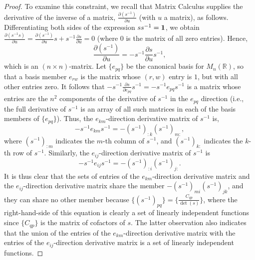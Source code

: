 \documentclass{amsart}
\numberwithin{equation}{section}
\theoremstyle{definition}
\numberwithin{theorem}{section}
\begin{document}
\begin{proof}
 To examine this constraint, we recall that Matrix Calculus supplies the derivative of the inverse of a matrix, $\frac{\partial (s^{-1})}{\partial u}$ (with $u$ a matrix), as follows.  Differentiating both sides of the expression
$ ss^{-1} = {\bf 1}$, we obtain $\frac{\partial (s^{-1}s)}{\partial u} = \frac{\partial (s^{-1})}{\partial u}s + s^{-1}\frac{\partial s}{\partial u}=0$ (where $0$ is the matrix of all zero entries).  Hence, 
 \[ \frac{\partial (s^{-1})}{\partial u} = -s^{-1}\frac{\partial s}{\partial u}s^{-1},\] which is an $(n\times n)$-matrix.  Let $\{ e_{pq}\}$ be the canonical basis for $ M_n(\mathbb{R})$, so that a basis member $e_{rw}$ is the matrix whose $(r,w)$ entry is $1$, but with all other entries zero.  It follows that $-s^{-1}\frac{\partial s}{\partial e_{pq}}s^{-1} = -s^{-1} e_{pq}s^{-1}$  is a matrix whose entries are the $n^2$ components of the derivative of $s^{-1}$ in the $e_{pq}$ direction (i.e., the full derivative of $s^{-1}$ is an array of all such matrices in each of the basis members of $\{ e_{pq}\}$).  
 Thus, the $e_{km}$-direction derivative matrix of $s^{-1}$ is, \begin{equation}\label{8/18/22.5} -s^{-1} e_{km}s^{-1} = -(s^{-1})_{:k} (s^{-1})_{m:},\end{equation} where $(s^{-1})_{:m}$ indicates the $m$-th column of $s^{-1}$, and $(s^{-1})_{k:}$ indicates the $k$-th row of $s^{-1}$.    Similarly, the $e_{ij}$-direction derivative matrix of $s^{-1}$ is \begin{equation}\label{8/18/22.6} -s^{-1} e_{ij}s^{-1} = -(s^{-1})_{:i} (s^{-1})_{j:}.\end{equation}  It is thus clear that the sets of entries of the $e_{km}$-direction derivative matrix and the $e_{ij}$-direction derivative  matrix share the member  $-(s^{-1})_{mi} (s^{-1})_{jk}$, and they can share no other member because $\{(s^{-1})_{pq}\} = \{\frac{C_{qp}}{\det(s)}\}$, where the right-hand-side of this equation is clearly a set of linearly independent functions since $\{C_{qp}\}$ is the matrix of cofactors of $s$. The latter observation also indicates that the union of the entries of the $e_{km}$-direction derivative matrix with the entries of the $e_{ij}$-direction derivative matrix is a set of linearly independent functions.


\end{proof}
\end{document}
